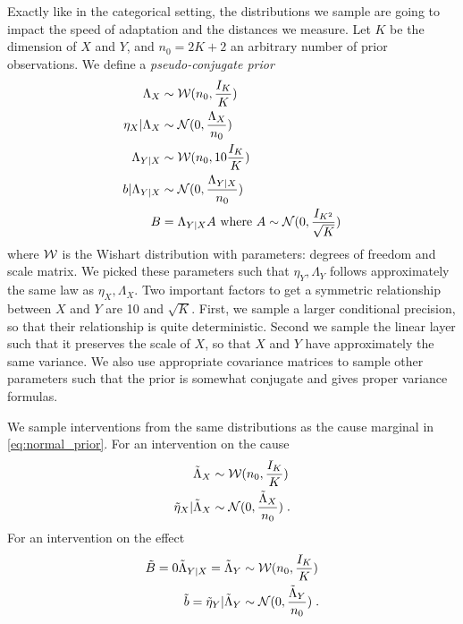 \begin{subappendices}
Exactly like in the categorical setting, the distributions we sample are going to impact the speed of adaptation and the distances we measure. Let $K$ be the dimension of $X$ and $Y$, and $n_0=2K+2$ an arbitrary number of prior observations. 
We define a \emph{pseudo-conjugate prior}
\begin{align}
    \Lambda_X  
    &\sim {\mathcal W}(n_0, \frac{I_K}{K}) \\
    \eta_X |\Lambda_{X} 
    &\sim {\mathcal N}(0, \frac{\Lambda_X}{n_0}) \\
    \Lambda_{Y|X} 
    &\sim {\mathcal W}(n_0, 10\frac{I_K}{K})\\
    b | \Lambda_{Y|X}
    &\sim {\mathcal N}(0, \frac{\Lambda_{Y|X}}{n_0}) \\
    B &=\Lambda_{Y|X} A \text{ where } A \sim {\mathcal N}(0, \frac{I_{K^2}}{\sqrt{K}})
    \label{eq:normal_prior}
\end{align}
where ${\mathcal W}$ is the Wishart distribution with parameters: degrees of freedom and scale matrix.
We picked these parameters such that $\eta_Y,\Lambda_Y$ follows approximately the same law as $\eta_X,\Lambda_X$.
Two important factors to get  a symmetric relationship between $X$ and $Y$ are 10 and $\sqrt{K}$.
First, we sample a larger conditional precision, so that their relationship is quite deterministic. 
Second we sample the linear layer such that it preserves the scale of $X$, so that $X$ and $Y$ have approximately the same variance. 
We also use appropriate covariance matrices to sample other parameters such that the prior is somewhat conjugate and gives proper variance formulas. 
 
 We sample interventions from the same distributions as the cause marginal in \eqref{eq:normal_prior}. For an intervention on the cause
 \begin{align*}
     \tilde \Lambda_X  &\sim {\mathcal W}(n_0, \frac{I_K}{K}) \\
     \tilde \eta_X |\tilde \Lambda_X &\sim {\mathcal N}(0, \frac{\tilde \Lambda_X}{n_0}) \; .
 \end{align*}
 For an intervention on the effect 
 \begin{align*}
     \tilde B = 0
     \tilde \Lambda_{Y|X} = \tilde \Lambda_{Y} & \sim {\mathcal W}(n_0, \frac{I_K}{K}) \\
     \tilde b = \tilde \eta_Y |\tilde \Lambda_{Y} &\sim {\mathcal N}(0, \frac{\tilde \Lambda_{Y}}{n_0}) \; .
 \end{align*}
 
 \end{subappendices}
 

